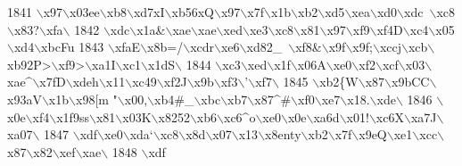 \begin{DoxyCode}
1841 \textcolor{stringliteral}{\(\backslash\)x97\(\backslash\)x03ee\(\backslash\)xb8\(\backslash\)xd7xI\(\backslash\)xb56xQ\(\backslash\)x97\(\backslash\)x7f\(\backslash\)x1b\(\backslash\)xb2\(\backslash\)xd5\(\backslash\)xea\(\backslash\)xd0\(\backslash\)xdc~\(\backslash\)xc8\(\backslash\)x83?\(\backslash\)xfa\(\backslash\)}
1842 \textcolor{stringliteral}{\(\backslash\)xdc\(\backslash\)x1a&\(\backslash\)xae\(\backslash\)xae\(\backslash\)xed\(\backslash\)xe3\(\backslash\)xc8\(\backslash\)x81\(\backslash\)x97\(\backslash\)xf9\(\backslash\)xf4D\(\backslash\)xc4\(\backslash\)x05\(\backslash\)xd4\(\backslash\)xbcFu%
1843 \textcolor{stringliteral}{\(\backslash\)xfaE\(\backslash\)x8b=/\(\backslash\)xcdr\(\backslash\)xe6\(\backslash\)xd82\_~\(\backslash\)xf8&\(\backslash\)x9f\(\backslash\)x9f;\(\backslash\)xccj\(\backslash\)xcb\(\backslash\)xb92P>\(\backslash\)xf9>\(\backslash\)xa1I\(\backslash\)xc1\(\backslash\)x1dS\(\backslash\)}
1844 \textcolor{stringliteral}{\(\backslash\)xc3\(\backslash\)xed\(\backslash\)x1f\(\backslash\)x06A\(\backslash\)xe0\(\backslash\)xf2\(\backslash\)xcf\(\backslash\)x03\(\backslash\)xae^\(\backslash\)x7fD\(\backslash\)xdeh\(\backslash\)x11\(\backslash\)xc49\(\backslash\)xf2J\(\backslash\)x9b\(\backslash\)xf3\(\backslash\)'\(\backslash\)xf7\(\backslash\)}
1845 \textcolor{stringliteral}{\(\backslash\)xb2\{W\(\backslash\)x87\(\backslash\)x9bCC\(\backslash\)x93aV\(\backslash\)x1b\(\backslash\)x98[m "\(\backslash\)x00,\(\backslash\)xb4#\_\(\backslash\)xbc\(\backslash\)xb7\(\backslash\)x87^#\(\backslash\)xf0\(\backslash\)xe7\(\backslash\)x18.\(\backslash\)xde\(\backslash\)}
1846 \textcolor{stringliteral}{\(\backslash\)x0e\(\backslash\)xf4\(\backslash\)x1f9ss\(\backslash\)x81\(\backslash\)x03K\(\backslash\)x8252\(\backslash\)xb6\(\backslash\)xc6^o\(\backslash\)xe0\(\backslash\)x0e\(\backslash\)xa6d\(\backslash\)x01!\(\backslash\)xc6X\(\backslash\)xa7J\(\backslash\)xa07\(\backslash\)}
1847 \textcolor{stringliteral}{\(\backslash\)xdf\(\backslash\)xe0\(\backslash\)xda`\(\backslash\)xc8\(\backslash\)x8d\(\backslash\)x07\(\backslash\)x13\(\backslash\)x8enty\(\backslash\)xb2\(\backslash\)x7f\(\backslash\)x9eQ\(\backslash\)xe1\(\backslash\)xcc\(\backslash\)x87\(\backslash\)x82\(\backslash\)xef\(\backslash\)xae\(\backslash\)}
1848 \textcolor{stringliteral}{\(\backslash\)xdf%
}}
\end{DoxyCode}
